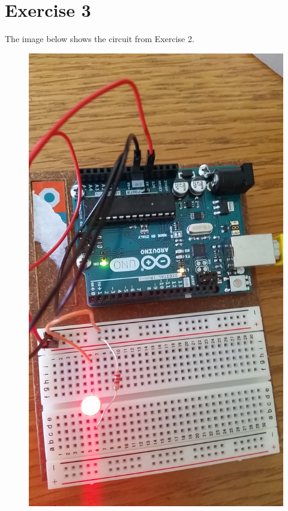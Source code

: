 \part*{Exercise 3}
The image below shows the circuit from Exercise 2.
\begin{figure}[H]
	\centering
	\includegraphics[width=\textwidth]{"../videos/exercise_3_5V_power_supply"}
\end{figure}